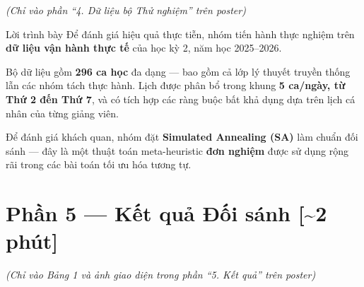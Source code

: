 \documentclass[12pt, a4paper]{article}
\begin{document}
\textit{(Chỉ vào phần ``4. Dữ liệu bộ Thử nghiệm'' trên poster)}

\begin{scriptbox}{Lời trình bày}
Để đánh giá hiệu quả thực tiễn, nhóm tiến hành thực nghiệm trên \textbf{dữ liệu vận hành thực tế} của học kỳ 2, năm học 2025--2026.

\medskip
Bộ dữ liệu gồm \textbf{296 ca học} đa dạng --- bao gồm cả lớp lý thuyết truyền thống lẫn các nhóm tách thực hành. Lịch được phân bổ trong khung \textbf{5 ca/ngày, từ Thứ 2 đến Thứ 7}, và có tích hợp các ràng buộc bất khả dụng dựa trên lịch cá nhân của từng giảng viên.

\medskip
Để đánh giá khách quan, nhóm đặt \textbf{Simulated Annealing (SA)} làm chuẩn đối sánh --- đây là một thuật toán meta-heuristic \textbf{đơn nghiệm} được sử dụng rộng rãi trong các bài toán tối ưu hóa tương tự.
\end{scriptbox}

\section{Phần 5 — Kết quả Đối sánh \hfill{\normalfont\color{MidGray}[\textasciitilde{}2 phút]}}

\textit{(Chỉ vào Bảng 1 và ảnh giao diện trong phần ``5. Kết quả'' trên poster)}
\end{document}
